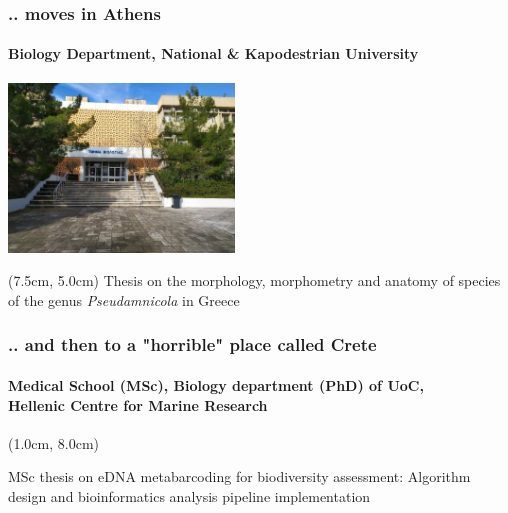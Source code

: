 \documentclass{beamer}
\begin{document}
   \begin{frame}
      \frametitle{.. moves in Athens}
      \framesubtitle{Biology Department, National \& Kapodestrian University}
      \includegraphics[width=60mm]{resources/biol_depart_ekpa.jpg} 
      \begin{textblock*}{5cm}(7.5cm, 5.0cm)
         \small Thesis on the morphology, morphometry and anatomy of species of the genus \textit{Pseudamnicola} in Greece
      \end{textblock*}
   \end{frame}


   \begin{frame}

      \frametitle{.. and then to a "horrible" place called Crete}
      \framesubtitle{
         Medical School (MSc), Biology department (PhD) of UoC, \\
         Hellenic Centre for Marine Research
         }


      \begin{textblock*}{10cm}(1.0cm, 8.0cm)

         \small MSc thesis on eDNA metabarcoding for biodiversity assessment: 
         Algorithm design and bioinformatics analysis pipeline implementation
         
      \end{textblock*}


   \end{frame}
\end{document}
